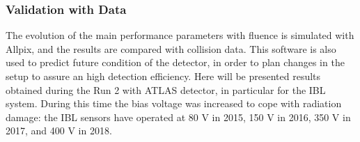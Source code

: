 

\subsubsection{Validation with Data}
\label{sec:dataval}
The evolution of the main performance parameters with fluence is simulated with Allpix, and the results are compared with collision data. This software is also used to predict future condition of the detector, in order to plan changes in the setup to assure an high detection efficiency. Here will be presented results obtained during the Run 2 with ATLAS detector, in particular for the IBL system. During this time the bias voltage was increased to cope with radiation damage: the IBL sensors have operated at 80 V in 2015, 150 V in 2016,  350 V in 2017, and 400 V in 2018. 

